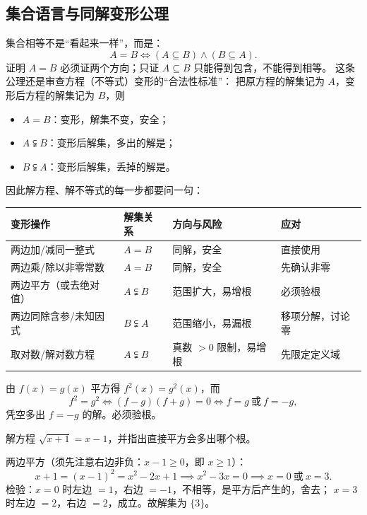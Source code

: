 \begin{explore}

\subsection{集合语言与同解变形公理}

集合相等不是“看起来一样”，而是：
\[
  A=B\iff(A\subseteq B)\land(B\subseteq A).
\]
证明 $A=B$ 必须证两个方向；只证 $A\subseteq B$ 只能得到包含，不能得到相等。
这条公理还是审查方程（不等式）变形的“合法性标准”：
把原方程的解集记为 $A$，变形后方程的解集记为 $B$，则
\begin{itemize}
  \item $A=B$：变形，解集不变，安全；
  \item $A\subsetneqq B$：变形后解集，多出的解是；
  \item $B\subsetneqq A$：变形后解集，丢掉的解是。
\end{itemize}
因此解方程、解不等式的每一步都要问一句：

\begin{center}
\footnotesize
\setlength{\tabcolsep}{3pt}
\renewcommand{\arraystretch}{1.4}
\begin{tabular}{p{2.6cm}p{2.8cm}p{3.2cm}p{3.2cm}}
\toprule
变形操作 & 解集关系 & 方向与风险 & 应对 \\
\midrule
两边加/减同一整式 & $A=B$ & 同解，安全 & 直接使用 \\
两边乘/除以非零常数 & $A=B$ & 同解，安全 & 先确认非零 \\
两边平方（或去绝对值） & $A\subsetneqq B$ & 范围扩大，易增根 & 必须验根 \\
两边同除含参/未知因式 & $B\subsetneqq A$ & 范围缩小，易漏根 & 移项分解，讨论零 \\
取对数/解对数方程 & $A\subsetneqq B$ & 真数 $>0$ 限制，易增根 & 先限定定义域 \\
\bottomrule
\end{tabular}
\end{center}

由 $f(x)=g(x)$ 平方得 $f^2(x)=g^2(x)$，而
\[
  f^2=g^2\iff(f-g)(f+g)=0\iff f=g\ \text{或}\ f=-g,
\]
凭空多出 $f=-g$ 的解。必须验根。

\begin{example}
解方程 $\sqrt{x+1}=x-1$，并指出直接平方会多出哪个根。
\end{example}
\begin{solution}
两边平方（须先注意右边非负：$x-1\geq0$，即 $x\geq1$）：
\[
  x+1=(x-1)^2=x^2-2x+1\implies x^2-3x=0\implies x=0\ \text{或}\ x=3.
\]
检验：$x=0$ 时左边 $=1$，右边 $=-1$，不相等，是平方后产生的，舍去；
$x=3$ 时左边 $=2$，右边 $=2$，成立。故解集为 $\{3\}$。
\end{solution}


\end{explore}
